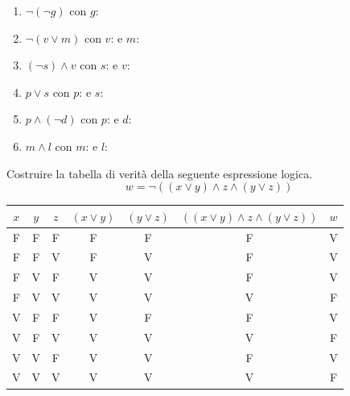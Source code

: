 \begin{soluzione}
\begin{enumerate}
    \item $\neg (\neg g)$\newline
    con $g$: 
    
    \item $\neg(v \vee m)$\newline
    con $v$:  e $m$: 
    
    \item $(\neg s) \wedge v$\newline
    con $s$:  e $v$: 
    
    \item $p \vee s$\newline
    con $p$:  e $s$: 
    
    \item $p \wedge (\neg d)$\newline
    con $p$:  e $d$: 
    
    \item $m \wedge l$\newline
    con $m$:  e $l $: 
\end{enumerate}
\end{soluzione}


\begin{esercizio}
Costruire la tabella di verità della seguente espressione logica.
$$w = \neg ((x \vee y) \wedge z \wedge (y \vee z))$$
\end{esercizio}
\begin{soluzione}
\begin{center}
    \begin{tabular}{ | c | c | c | c | c | c | c |}
        \hline 
        $x$ & $y$ & $z$ & $(x \vee y)$ &  $(y \vee z)$ & $((x \vee y) \wedge z \wedge (y \vee z))$ & $w$ \\
        \hline 
        F & F & F & F &	F &	F	& V \\
        \hline
        F & F & V & F & V &	F	& V \\
        \hline
        F & V & F & V & V &	F	&	V \\
        \hline
        F & V & V &	 V & V & V	& F \\
        \hline
        V & F & F & V &	F &	F	& V \\
        \hline
        V & F & V & V &	V &	V & F \\
        \hline
        V & V & F & V &	V &	F &V \\
        \hline
        V & V & V & V &	V &	V &F \\
        \hline
    \end{tabular}
\end{center}
\end{soluzione}

